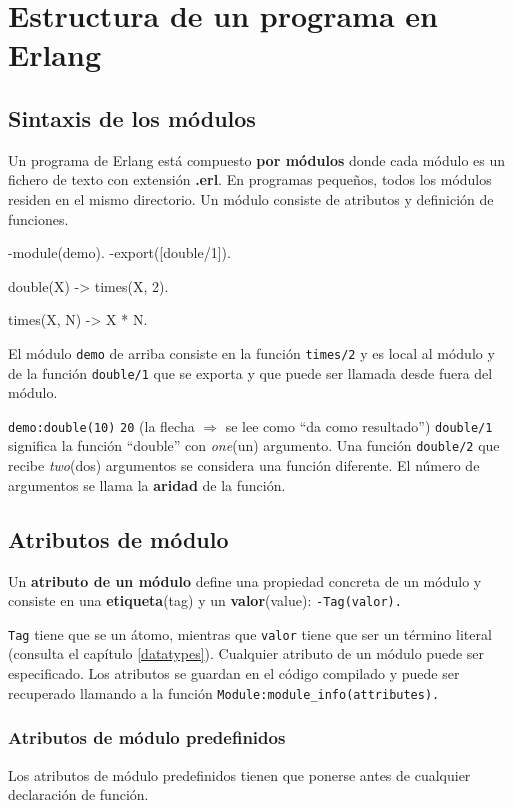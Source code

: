 \chapter{Estructura de un programa en Erlang}

\section{Sintaxis de los m\'odulos}

Un programa de Erlang est\'a compuesto \textbf{por m\'odulos} donde cada m\'odulo
es un fichero de texto con extensi\'on \textbf{.erl}. En programas peque\~nos, todos
los m\'odulos residen en el mismo directorio. Un m\'odulo consiste de atributos y 
definici\'on de funciones.

\begin{erlang}
-module(demo).
-export([double/1]).

double(X) -> times(X, 2).

times(X, N) -> X * N.
\end{erlang}

El m\'odulo \texttt{demo} de arriba consiste en la funci\'on \texttt{times/2}
y es local al m\'odulo y de la funci\'on \texttt{double/1} que se exporta
y que puede ser llamada desde fuera del m\'odulo.

\texttt{demo:double(10)} \resultingin \texttt{20}\hfill
(la flecha $\Rightarrow$ se lee como ``da como resultado'') \texttt{double/1} significa la funci\'on ``double'' con \textit{one}(un)
argumento. Una funci\'on \texttt{double/2} que recibe \textit{two}(dos) argumentos se considera una funci\'on diferente. El n\'umero de argumentos se llama la \textbf{aridad} de la funci\'on.

\section{Atributos de m\'odulo}
Un \textbf{atributo de un m\'odulo} define una propiedad concreta de un m\'odulo y consiste en una \textbf{etiqueta}(tag) y un \textbf{valor}(value):
\texttt{-Tag(valor).} 

\texttt{Tag} tiene que se un \'atomo, mientras que \texttt{valor} tiene que ser un t\'ermino literal (consulta el cap\'itulo \ref{datatypes}). Cualquier atributo de un m\'odulo puede ser especificado. Los atributos se guardan en el c\'odigo compilado y puede ser recuperado llamando a la funci\'on \texttt{Module:module\_info(attributes).}

\subsection{Atributos de m\'odulo predefinidos}
Los atributos de m\'odulo predefinidos tienen que ponerse antes de cualquier declaraci\'on de funci\'on.

